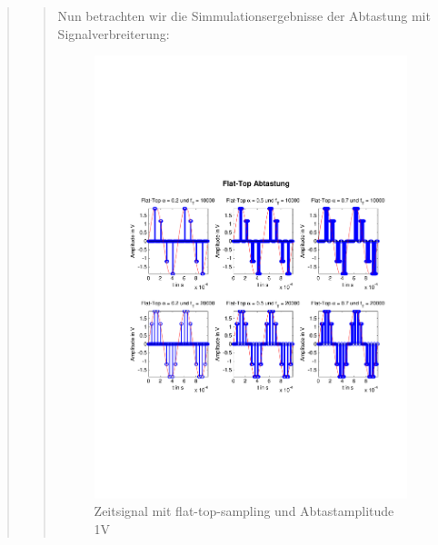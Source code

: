 \begin{quote}
\begin{quote}
  	    Nun betrachten wir die Simmulationsergebnisse der Abtastung mit
  	    Signalverbreiterung:
  	    
  	    \begin{figure}[H]
    \centering
        \includegraphics[scale=0.7, trim = 1.5cm 6cm 1cm 8cm,
        clip]{./Bilder/flat-top-zeit_1V}
            \caption{Zeitsignal mit flat-top-sampling und Abtastamplitude 1V}
  	    \end{figure}
  	    

\end{quote}
\end{quote}
